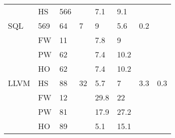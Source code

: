 \begin{figure*}[!t]
\begin{tabular}{|l|l||l|l|ll|l|l|}
                        &HS           & 566                                          &                                            & \multicolumn{1}{l|}{\cellcolor[HTML]{C0C0C0}7.1}  & \cellcolor[HTML]{C0C0C0}9.1  &                       &                       \\ \cline{2-2} \cline{4-5}
\multirow{-4}{*}{SQL}              & 569                                          & \multirow{-4}{*}{64}                       & \multicolumn{1}{l|}{\cellcolor[HTML]{C0C0C0}7}    & \cellcolor[HTML]{C0C0C0}9    & \multirow{-4}{*}{5.6} & \multirow{-4}{*}{0.2} \\ \hline
                              &FW     & 11                                           &                                            & \multicolumn{1}{l|}{\cellcolor[HTML]{C0C0C0}7.8}  & \cellcolor[HTML]{C0C0C0}9    &                       &                       \\ \cline{2-2} \cline{4-5}
                        &PW           & 62                                           &                                            & \multicolumn{1}{l|}{\cellcolor[HTML]{C0C0C0}7.4}  & \cellcolor[HTML]{C0C0C0}10.2 &                       &                       \\ \cline{2-2} \cline{4-5}
                        &HO           & 62                                           &                                            & \multicolumn{1}{l|}{\cellcolor[HTML]{C0C0C0}7.4}  & \cellcolor[HTML]{C0C0C0}10.2 &                       &                       \\ \cline{2-2} \cline{4-5}
\multirow{-4}{*}{LLVM}     &HS        & 88                                           & \multirow{-4}{*}{32}                       & \multicolumn{1}{l|}{\cellcolor[HTML]{C0C0C0}5.7}  & \cellcolor[HTML]{C0C0C0}7    & \multirow{-4}{*}{3.3} & \multirow{-4}{*}{0.3} \\ \hline
                             &FW      & 12                                           &                                            & \multicolumn{1}{l|}{\cellcolor[HTML]{C0C0C0}29.8} & \cellcolor[HTML]{C0C0C0}22   &                       &                       \\ \cline{2-2} \cline{4-5}
                    &PW               & 81                                           &                                            & \multicolumn{1}{l|}{\cellcolor[HTML]{C0C0C0}17.9} & \cellcolor[HTML]{C0C0C0}27.2 &                       &                       \\ \cline{2-2} \cline{4-5}
                       &HO            & 89                                           &                                            & \multicolumn{1}{l|}{5.1}                          & 15.1                         &                       &                       \\ \cline{2-2} \cline{4-5}

\end{tabular}
\end{figure*}
